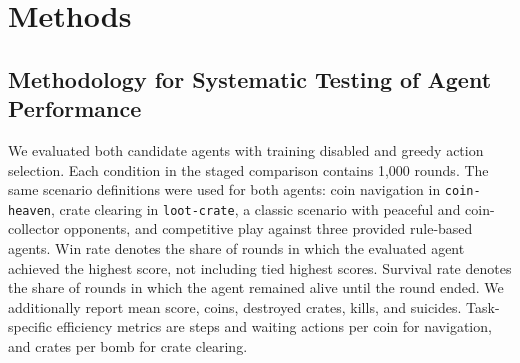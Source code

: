 \documentclass[article, 10pt]{IEEEtran}
\begin{document}




\section{Methods}\label{sec:4_methods}

\subsection{Methodology for Systematic Testing of Agent Performance}\label{sec:evaluation_methodology}
We evaluated both candidate agents with training disabled and greedy action selection. Each condition in the staged comparison contains 1,000 rounds. The same scenario definitions were used for both agents: coin navigation in \texttt{coin-heaven}, crate clearing in \texttt{loot-crate}, a classic scenario with peaceful and coin-collector opponents, and competitive play against three provided rule-based agents. Win rate denotes the share of rounds in which the evaluated agent achieved the highest score, not including tied highest scores. Survival rate denotes the share of rounds in which the agent remained alive until the round ended. We additionally report mean score, coins, destroyed crates, kills, and suicides. Task-specific efficiency metrics are steps and waiting actions per coin for navigation, and crates per bomb for crate clearing.
\end{document}
